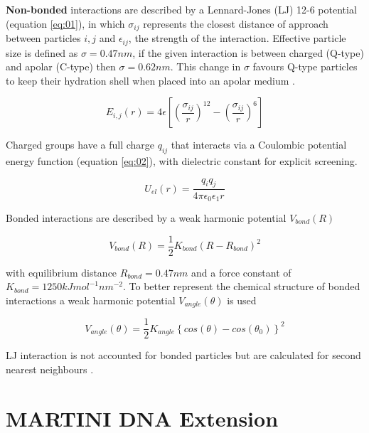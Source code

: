 \documentclass[
	12pt,				%
	openright,			%
	twoside,			%
	a4paper,			%
	english,			%
	french,				%
	spanish,			%
	brazil,				%
	]{abntex2}
\begin{document}
\textbf{Non-bonded} interactions are described by a Lennard-Jones (LJ) 12-6 potential (equation \ref{eq:01}), in which $\sigma_{ij}$ represents the closest distance of approach between particles $i, j$ and $\epsilon_{ij}$, the strength of the interaction. Effective particle size is defined as $\sigma=0.47nm$, if the given interaction is between charged (Q-type) and apolar (C-type) then $\sigma = 0.62nm$. This change in $\sigma$ favours Q-type particles to keep their hydration shell when placed into an apolar medium \cite{Marrink2007}.

\begin{equation}
E_{i,j}(r) = 4\epsilon \left [\left ( \frac{\sigma_{ij} }{r} \right )^{12} - \left ( \frac{\sigma_{ij} }{r} \right )^{6} \right ]
\label{eq:01}
\end{equation}

Charged groups have a full charge $q_{ij}$ that interacts via a Coulombic potential energy function (equation \ref{eq:02}), with dielectric constant for explicit screening.

\begin{equation}
U_{el}(r) = \frac{q_{i} q_{j}}{4\pi \epsilon_{0} \epsilon_{1} r}
\label{eq:02}
\end{equation}

Bonded interactions are described by a weak harmonic potential $V_{bond}(R)$

\begin{equation}
V_{bond}(R) = \frac{1}{2} K_{bond} \left ( R- R_{bond} \right )^2
\label{eq:03}
\end{equation}


with equilibrium distance $R_{bond} = 0.47 nm$ and a force constant of $K_{bond} = 1250 kJ mol^{-1} nm^{-2}$. To better represent the chemical structure of bonded interactions a weak harmonic potential $V_{angle}(\theta)$ is used 

\begin{equation}
V_{angle}(\theta ) = \frac{1}{2}K_{angle}\left \{ cos(\theta) -cos(\theta_{0}) \right \}^2
\label{eq:03}
\end{equation}

LJ interaction is not accounted for bonded particles but are calculated for second nearest neighbours \cite{Marrink2007}.

\section{MARTINI DNA Extension}
\end{document}
